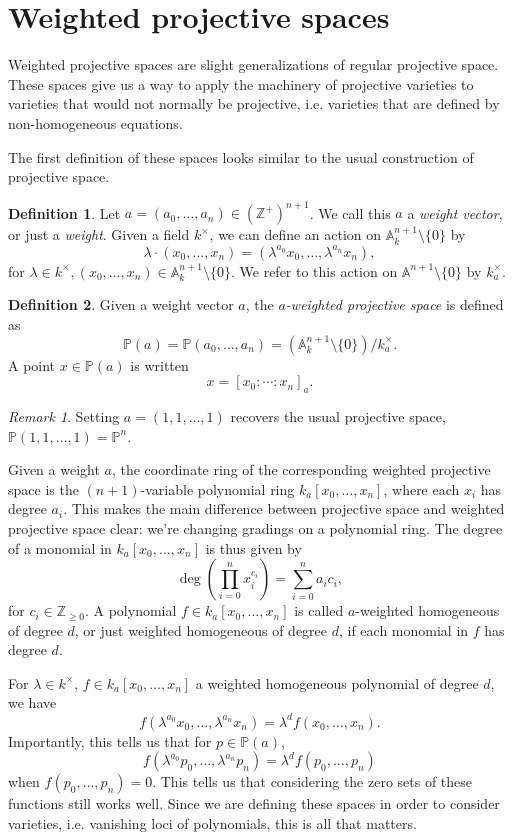 \documentclass[12pt,twoside]{reedthesis}
\theoremstyle{plain}
\theoremstyle{definition}
\newtheorem{definition}{Definition}[section]
\theoremstyle{remark}
\newtheorem{remark}{Remark}[section]
\newcommand{\ZZ}{\mathbb{Z}}
\newcommand{\Affine}{\mathbb{A}}
\newcommand{\Proj}{\mathbb{P}}
\begin{document}
\section{Weighted projective spaces}
Weighted projective spaces are slight generalizations of regular projective space. These spaces give us a way to apply the machinery of projective varieties to varieties that would not normally be projective, i.e. varieties that are defined by non-homogeneous equations.

The first definition of these spaces looks similar to the usual construction of projective space.
\begin{definition}
Let $a=(a_0,\ldots,a_n)\in(\ZZ^+)^{n+1}$. We call this $a$ a \emph{weight vector}, or just a \emph{weight}. Given a field $k^\times$, we can define an action on $\Affine^{n+1}_k\setminus\{0\}$ by
\[
\lambda\cdot(x_0,\ldots,x_n)=(\lambda^{a_0}x_0,\ldots,\lambda^{a_n}x_n),
\]
for $\lambda\in k^\times, (x_0,\ldots,x_n)\in\Affine^{n+1}_k\setminus\{0\}$. We refer to this action on $\Affine^{n+1}\setminus\{0\}$ by $k^\times_a$.
\end{definition}
\begin{definition}
Given a weight vector $a$, the \emph{$a$-weighted projective space} is defined as
\[
\Proj(a)=\Proj(a_0,\ldots,a_n)=(\Affine^{n+1}_k\setminus\{0\})/k^\times_a.
\]
A point $x\in\Proj(a)$ is written
\[
x=[x_0:\cdots:x_n]_a.
\]
\end{definition}
\begin{remark}
Setting $a=(1,1,\ldots,1)$ recovers the usual projective space, $\Proj(1,1,\ldots,1)=\Proj^n$.
\end{remark}
Given a weight $a$, the coordinate ring of the corresponding weighted projective space is the $(n+1)$-variable polynomial ring $k_a[x_0,\ldots,x_n]$, where each $x_i$ has degree $a_i$. This makes the main difference between projective space and weighted projective space clear: we're changing gradings on a polynomial ring. The degree of a monomial in $k_a[x_0,\ldots,x_n]$ is thus given by
\[
\deg\left(\prod_{i=0}^n x_i^{c_i}\right)=\sum_{i=0}^n a_ic_i,
\]
for $c_i\in\ZZ_{\geq0}$. A polynomial $f\in k_a[x_0,\ldots,x_n]$ is called $a$-weighted homogeneous of degree $d$, or just weighted homogeneous of degree $d$, if each monomial in $f$ has degree $d$. 

For $\lambda\in k^\times$, $f\in k_a[x_0,\ldots,x_n]$ a weighted homogeneous polynomial of degree $d$, we have
\[
f(\lambda^{a_0}x_0,\ldots,\lambda^{a_n}x_n)=\lambda^d f(x_0,\ldots,x_n).
\]
Importantly, this tells us that for $p\in\Proj(a)$, 
\[
f(\lambda^{a_0}p_0,\ldots,\lambda^{a_n}p_n)=\lambda^d f(p_0,\ldots,p_n)
\]
when $f(p_0,\ldots,p_n)=0$. This tells us that considering the zero sets of these functions still works well. Since we are defining these spaces in order to consider varieties, i.e. vanishing loci of polynomials, this is all that matters.
\end{document}
